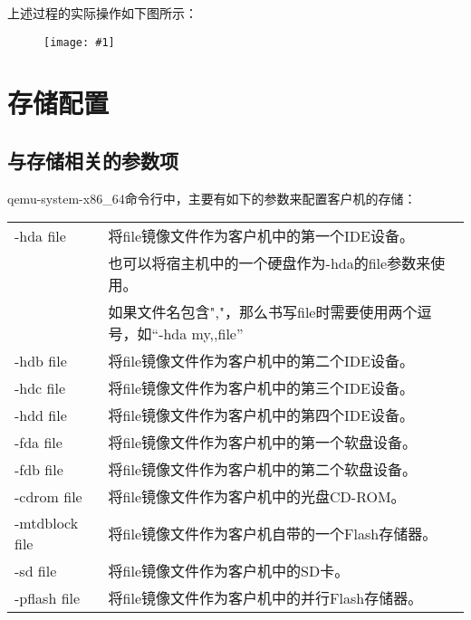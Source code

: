 \documentclass[a4paper,left=2.5cm,right=2.5cm,11pt]{article}
\newcommand{\fic}[1]{\begin{figure}[H]
		\center
		\texttt{[image: \#1]}
	\end{figure}}
\newcommand{\interval}{\vspace{0.5em}}
\begin{document}
	上述过程的实际操作如下图所示：
	\fic{6.png}

\clearpage

\section{存储配置}
\subsection{与存储相关的参数项}
	qemu-system-x86\_64命令行中，主要有如下的参数来配置客户机的存储：
	\interval
	\begin{longtable}{p{2.3cm}p{10cm}}
	\hline
	-hda file & 将file镜像文件作为客户机中的第一个IDE设备。 \\
			  & 也可以将宿主机中的一个硬盘作为-hda的file参数来使用。\\
			  & 如果文件名包含","，那么书写file时需要使用两个逗号，如“-hda my,,file” \\
	\hline
	-hdb file & 将file镜像文件作为客户机中的第二个IDE设备。 \\
	\hline
	-hdc file & 将file镜像文件作为客户机中的第三个IDE设备。 \\
	\hline
	-hdd file & 将file镜像文件作为客户机中的第四个IDE设备。 \\
	\hline
	-fda file & 将file镜像文件作为客户机中的第一个软盘设备。 \\
	\hline
	-fdb file & 将file镜像文件作为客户机中的第二个软盘设备。 \\
	\hline
	-cdrom file & 将file镜像文件作为客户机中的光盘CD-ROM。 \\
	\hline
	-mtdblock file & 将file镜像文件作为客户机自带的一个Flash存储器。 \\
	\hline
	-sd file & 将file镜像文件作为客户机中的SD卡。 \\
	\hline
	-pflash file & 将file镜像文件作为客户机中的并行Flash存储器。 \\
	\hline
	\end{longtable}
	
\end{document}
